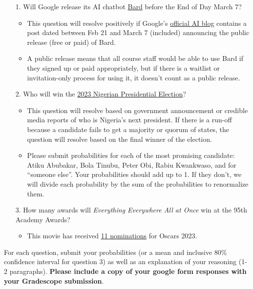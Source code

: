\documentclass[11pt]{article}
\begin{document}
\begin{enumerate}
	\item[1.] Will Google release its AI chatbot \href{https://blog.google/technology/ai/bard-google-ai-search-updates/}{Bard} before the End of Day March 7?
	\begin{itemize}
		\item This question will resolve positively if Google's \href{https://blog.google/technology/ai/}{official AI blog} contains a post dated between Feb 21 and March 7 (included) announcing the public release (free or paid) of Bard. 
        \item A public release means that all course staff would be able to use Bard if they signed up or paid appropriately, but if there is a waitlist or invitation-only process for using it, it doesn't count as a public release. 
	\end{itemize} 
	\item[2.] Who will win the \href{https://www.bbc.com/news/world-africa-64496042}{2023 Nigerian Presidential Election}?
	\begin{itemize}
		\item This question will resolve based on government announcement or credible media reports of who is Nigeria's next president. If there is a run-off because a candidate fails to get a majority or quorum of states, the question will resolve based on the final winner of the election. 
        \item Please submit probabilities for each of the most promising candidate: Atiku Abubakar, Bola Tinubu, Peter Obi, Rabiu Kwankwaso, and for ``someone else''. Your probabilities should add up to 1. If they don't, we will divide each probability by the sum of the probabilities to renormalize them.
    \end{itemize}

	\item[3.] How many awards will \emph{Everything Everywhere All at Once} win at the 95th Academy Awards?
	\begin{itemize}
		\item This movie has received \href{https://www.imdb.com/title/tt6710474/awards/}{11 nominations} for Oscars 2023.  
	\end{itemize} 
\end{enumerate}

For each question, submit your probabilities (or a mean and inclusive 80\% confidence interval for question 3) as well as an explanation of your reasoning (1-2 paragraphs). \textbf{Please include a copy of your google form responses with your Gradescope submission}. 
\end{document}
